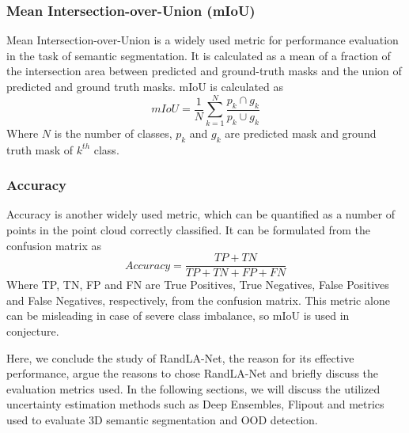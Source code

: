 \subsubsection{Mean Intersection-over-Union (mIoU)}
Mean Intersection-over-Union is a widely used metric for performance evaluation in the task of semantic segmentation.
It is calculated as a mean of a fraction of the intersection area between predicted and ground-truth masks and the union of predicted and ground truth masks.
mIoU is calculated as
$$mIoU=\frac{1}{N}\sum_{k=1}^N \frac{p_k\cap g_k}{p_k \cup g_k}$$
Where $N$ is the number of classes, $p_k$ and $g_k$ are predicted mask and ground truth mask of $k^{th}$ class.

\subsubsection{Accuracy}
Accuracy is another widely used metric, which can be quantified as a number of points in the point cloud correctly classified.
It can be formulated from the confusion matrix as
$$Accuracy = \frac{TP+TN}{TP+TN+FP+FN}$$
Where TP, TN, FP and FN are True Positives, True Negatives, False Positives and False Negatives, respectively, from the confusion matrix.
This metric alone can be misleading in case of severe class imbalance, so mIoU is used in conjecture.

Here, we conclude the study of RandLA-Net, the reason for its effective performance, argue the reasons to chose RandLA-Net and briefly discuss the evaluation metrics used.
In the following sections, we will discuss the utilized uncertainty estimation methods such as Deep Ensembles, Flipout and metrics used to evaluate 3D semantic segmentation and OOD detection.
